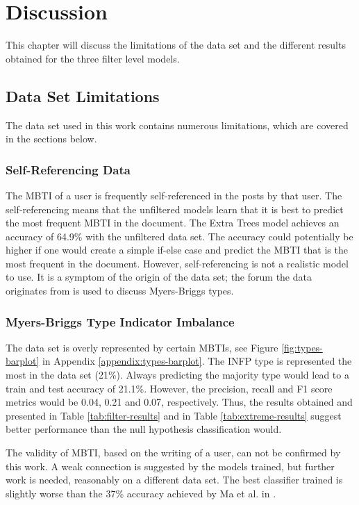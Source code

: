 \section{Discussion}

This chapter will discuss the limitations of the data set and the different results obtained for the three filter level models. 

\subsection{Data Set Limitations}

The data set used in this work contains numerous limitations, which are covered in the sections below.

\subsubsection{Self-Referencing Data}
The MBTI of a user is frequently self-referenced in the posts by that user. 
The self-referencing means that the unfiltered models learn that it is best to predict the most frequent MBTI in the document.
The Extra Trees model achieves an accuracy of 64.9\% with the unfiltered data set.
The accuracy could potentially be higher if one would create a simple if-else case and predict the MBTI that is the most frequent in the document.
However, self-referencing is not a realistic model to use.
It is a symptom of the origin of the data set; the forum the data originates from is used to discuss Myers-Briggs types.

\subsubsection{Myers-Briggs Type Indicator Imbalance}
The data set is overly represented by certain MBTIs, see Figure \ref{fig:types-barplot} in Appendix \ref{appendix:types-barplot}.
The INFP type is represented the most in the data set (21\%).
Always predicting the majority type would lead to a train and test accuracy of 21.1\%.
However, the precision, recall and F1 score metrics would be 0.04, 0.21 and 0.07, respectively.
Thus, the results obtained and presented in Table \ref{tab:filter-results} and in Table \ref{tab:extreme-results} suggest better performance than the null hypothesis classification would.

The validity of MBTI, based on the writing of a user, can not be confirmed by this work.
A weak connection is suggested by the models trained, but further work is needed, reasonably on a different data set.
The best classifier trained is slightly worse than the 37\% accuracy achieved by Ma et al. in \cite{maneural}.


